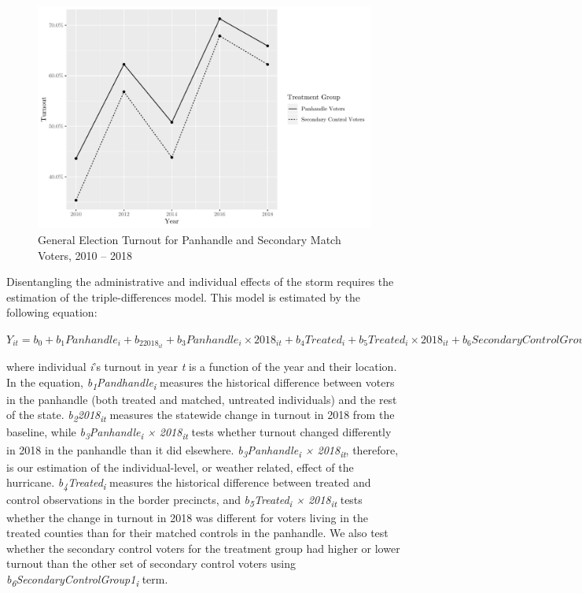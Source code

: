 \documentclass[
  12pt,
]{article}
\begin{document}
\begin{figure}[H]

{\centering \includegraphics{hurricane_michael_files/figure-latex/second-parallel-chunk-1} 

}

\caption{\label{fig:second-parallel}General Election Turnout for Panhandle and Secondary Match Voters, 2010 -- 2018}\label{fig:second-parallel-chunk}
\end{figure}

Disentangling the administrative and individual effects of the storm requires the estimation of the triple-differences model. This model is estimated by the following equation:

\(Y_{it}=b_0+b_1Panhandle_{i}+b_22018_{it}+b_3Panhandle_{i}\times 2018_{it} + b_4Treated_{i} + b_5Treated_{i}\times 2018_{it} + b_6Secondary Control Group 1_{i}\)

where individual \emph{i}'s turnout in year \emph{t} is a function of the year and their location. In the equation, \emph{b\textsubscript{1}Pandhandle\textsubscript{i}} measures the historical difference between voters in the panhandle (both treated and matched, untreated individuals) and the rest of the state. \emph{b\textsubscript{2}2018\textsubscript{it}} measures the statewide change in turnout in 2018 from the baseline, while \emph{b\textsubscript{3}Panhandle\textsubscript{i} × 2018\textsubscript{it}} tests whether turnout changed differently in 2018 in the panhandle than it did elsewhere. \emph{b\textsubscript{3}Panhandle\textsubscript{i} × 2018\textsubscript{it}}, therefore, is our estimation of the individual-level, or weather related, effect of the hurricane. \emph{b\textsubscript{4}Treated\textsubscript{i}} measures the historical difference between treated and control observations in the border precincts, and \emph{b\textsubscript{5}Treated\textsubscript{i} × 2018\textsubscript{it}} tests whether the change in turnout in 2018 was different for voters living in the treated counties than for their matched controls in the panhandle. We also test whether the secondary control voters for the treatment group had higher or lower turnout than the other set of secondary control voters using \emph{b\textsubscript{6}SecondaryControlGroup1\textsubscript{i}} term.
\end{document}
